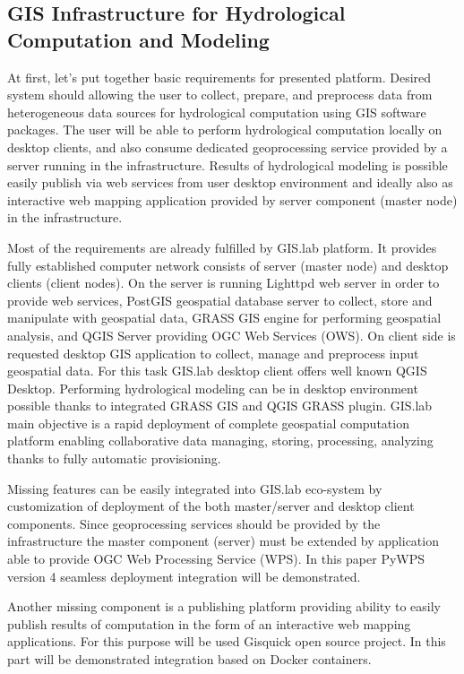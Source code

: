 \documentclass{isprs}
\begin{document}
\subsection{GIS Infrastructure for Hydrological Computation and
  Modeling}\label{GIS Infrastructure for Hydrological Computation and
  Modeling}

At first, let's put together basic requirements for presented
platform. Desired system should allowing the user to collect, prepare,
and preprocess data from heterogeneous data sources for hydrological
computation using GIS software packages. The user will be able to
perform hydrological computation locally on desktop clients, and also
consume dedicated geoprocessing service provided by a server running
in the infrastructure. Results of hydrological modeling is possible
easily publish via web services from user desktop environment and
ideally also as interactive web mapping application provided by server
component (master node) in the infrastructure.

Most of the requirements are already fulfilled by GIS.lab
platform. It provides fully established computer network consists of
server (master node) and desktop clients (client nodes). On the server
is running Lighttpd web server in order to provide web services,
PostGIS geospatial database server to collect, store and manipulate
with geospatial data, GRASS GIS engine for performing geospatial
analysis, and QGIS Server providing OGC Web Services (OWS). On client
side is requested desktop GIS application to collect, manage and
preprocess input geospatial data. For this task GIS.lab desktop client
offers well known QGIS Desktop. Performing hydrological modeling can
be in desktop environment possible thanks to integrated GRASS GIS and
QGIS GRASS plugin. GIS.lab main objective is a rapid deployment of
complete geospatial computation platform enabling collaborative data
managing, storing, processing, analyzing thanks to fully automatic
provisioning.

Missing features can be easily integrated into GIS.lab eco-system by
customization of deployment of the both master/server and desktop
client components. Since geoprocessing services should be provided by
the infrastructure the master component (server) must be extended by
application able to provide OGC Web Processing Service (WPS). In this
paper PyWPS version 4 seamless deployment integration will be
demonstrated.

Another missing component is a publishing platform providing ability
to easily publish results of computation in the form of an interactive
web mapping applications. For this purpose will be used Gisquick open
source project. In this part will be demonstrated integration based on
Docker containers.
\end{document}
